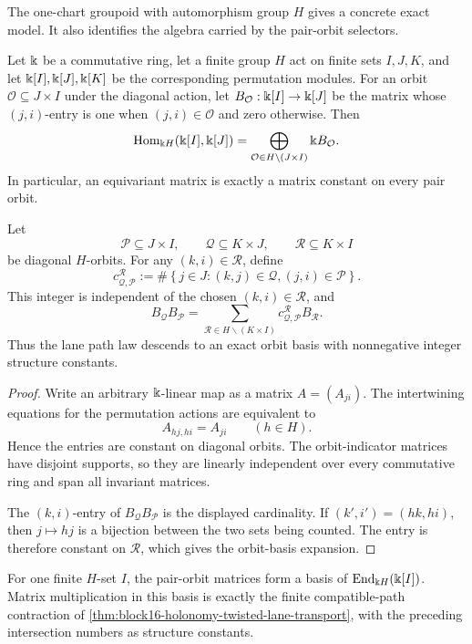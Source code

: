 The one-chart groupoid with automorphism group \(H\) gives a concrete exact
model.  It also identifies the algebra carried by the pair-orbit selectors.

\begin{theorem}
\label{thm:block16-permutation-orbital-calculus}
Let \(\Bbbk\) be a commutative ring, let a finite group \(H\) act on finite sets
\(I,J,K\), and let \(\Bbbk[I],\Bbbk[J],\Bbbk[K]\) be the corresponding permutation
modules.  For an orbit
\(\mathcal O\subseteq J\times I\) under the diagonal action, let
\(B_{\mathcal O}:\Bbbk[I]\to\Bbbk[J]\) be the matrix whose \((j,i)\)-entry is one
when \((j,i)\in\mathcal O\) and zero otherwise.  Then
\[
 \operatorname{Hom}_{\Bbbk H}(\Bbbk[I],\Bbbk[J])
 =
 \bigoplus_{\mathcal O\in H\backslash(J\times I)}
 \Bbbk B_{\mathcal O}.
\]
In particular, an equivariant matrix is exactly a matrix constant on every
pair orbit.

Let
\[
 \mathcal P\subseteq J\times I,
 \qquad
 \mathcal Q\subseteq K\times J,
 \qquad
 \mathcal R\subseteq K\times I
\]
be diagonal \(H\)-orbits.  For any \((k,i)\in\mathcal R\), define
\[
 c^{\mathcal R}_{\mathcal Q,\mathcal P}
 :=
 \#\left\{
 j\in J:(k,j)\in\mathcal Q,
 (j,i)\in\mathcal P
 \right\}.
\]
This integer is independent of the chosen \((k,i)\in\mathcal R\), and
\[
 B_{\mathcal Q}B_{\mathcal P}
 =
 \sum_{\mathcal R\in H\backslash(K\times I)}
 c^{\mathcal R}_{\mathcal Q,\mathcal P}B_{\mathcal R}.
\]
Thus the lane path law descends to an exact orbit basis with nonnegative
integer structure constants.
\end{theorem}

\begin{proof}
Write an arbitrary \(\Bbbk\)-linear map as a matrix \(A=(A_{ji})\).  The
intertwining equations for the permutation actions are equivalent to
\[
 A_{h j,h i}=A_{j i}
 \qquad(h\in H).
\]
Hence the entries are constant on diagonal orbits.  The orbit-indicator
matrices have disjoint supports, so they are linearly independent over every
commutative ring and span all invariant matrices.

The \((k,i)\)-entry of
\(B_{\mathcal Q}B_{\mathcal P}\) is the displayed cardinality.  If
\((k',i')=(hk,hi)\), then \(j\mapsto hj\) is a bijection between the two sets
being counted.  The entry is therefore constant on \(\mathcal R\), which gives
the orbit-basis expansion.
\end{proof}

\begin{corollary}
\label{cor:block16-orbital-endomorphism-algebra}
For one finite \(H\)-set \(I\), the pair-orbit matrices form a basis of
\(\operatorname{End}_{\Bbbk H}(\Bbbk[I])\).  Matrix multiplication in this basis is exactly the
finite compatible-path contraction of
\cref{thm:block16-holonomy-twisted-lane-transport}, with the preceding
intersection numbers as structure constants.
\end{corollary}

